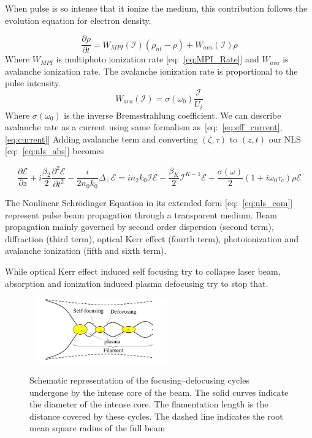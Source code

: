 \documentclass[../main.tex]{subfiles}
\begin{document}
	When pulse is so intense that it ionize the medium, this contribution
	follows the evolution equation for electron density.

	\begin{equation} \label{eq:electron}
		\frac{\partial \rho}{\partial t} =
		W_{MPI}(\mathcal{I})(\rho_{nt} - \rho) +
		W_{ava}(\mathcal{I})\rho
	\end{equation}
	Where $W_{MPI}$ is multiphoto ionization rate [eq:~\ref{eq:MPI_Rate}]
	and $W_{ava}$ is avalanche ionization rate. The avalanche ionization
	rate is proportional to the pulse intensity.
	\begin{equation} \label{eq:ava_rate}
		W_{ava}(\mathcal{I}) = \sigma(\omega_0) \frac{\mathcal{I}}{U_i}
	\end{equation}
	Where $\sigma(\omega_0)$ is the inverse Bremsstrahlung coefficient.
	We can describe avalanche rate as a current using same formalism
	as~[eq:~\ref{eq:eff_current}, \ref{eq:current}]
	Adding avalanche term and
	converting $(\zeta, \tau)$ to $(z,t)$ our NLS [eq:~\ref{eq:nls_abs}] becomes
	\begin{widetext}
	\begin{equation} \label{eq:nls_com}
		\frac{\partial \mathcal{E}}{\partial z}
		+ i\frac{\beta_2}{2} \frac{\partial^2 \mathcal{E}}{\partial t^2}
		- \frac{i}{2n_0k_0}\Delta_\perp \mathcal{E}
		= in_2k_0\mathcal{I} \mathcal{E}
		- \frac{\beta_K}{2}\mathcal{I}^{K-1} \mathcal{E}
		- \frac{\sigma(\omega)}{2}(1 + i\omega_0 \tau_c)\rho\mathcal{E}
	\end{equation}
	\end{widetext}


	The Nonlinear Schrödinger Equation in its  extended form
	[eq:~\ref{eq:nls_com}] represent pulse beam propagation through a
	transparent medium. Beam propagation mainly governed by second order
	dispersion (second term), diffraction (third term), optical Kerr effect
	(fourth term), photoionization and avalanche ionization (fifth and sixth
	term).

	While optical Kerr effect induced self focusing try to collapse laser
	beam, absorption and ionization induced plasma defocusing try to stop
	that.

	\begin{figure}[h] ~\cite{couairon_femtosecond_2007}
		\includegraphics[width=0.5\textwidth]{images/filament.png}
	\caption{Schematic representation of the focusing–defocusing cycles undergone by the intense core of the beam. The solid curves indicate the diameter
of the intense core. The flamentation length is the distance covered by these cycles. The dashed line indicates the root mean square radius of the
full beam \label{fig:filament}}
	\end{figure}
\end{document}
